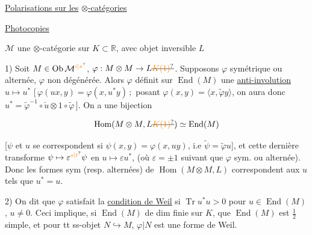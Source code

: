 
\uline{Polarisations sur les} \uline{$\otimes$-catégories }


\uline{Photocopies}


 $\mathcal M$ une $\otimes$-catégorie sur $K\subset\mathbb R$, avec   objet inversible  $L$

1) Soit $M\in\operatorname{Ob}\mathcal M^{\unsure{i|*}}$, $\varphi:M\otimes M\to L\deleted{\unsure{K(1)}}$. Supposons $\varphi$ symétrique ou alternée, $\varphi$ non dégénérée. Alors $\varphi$ définit sur $\operatorname{End}(M)$ une \uline{anti-involution} $u\mapsto u^*$ $[\,\varphi(ux,y)=\varphi(x,u^*y)\,;$ posant $\varphi(x,y)=\langle x,\widetilde\varphi y\rangle$,  on aura donc $u^*=\widetilde\varphi^{-1}\circ\check u\otimes1\circ\widetilde\varphi\,]$.  On a une bijection

\[
\operatorname{Hom}(M\otimes M,L\deleted{\unsure{K(1)}})\simeq\operatorname{End}(M)
\]

[$\psi$ et $u$ se correspondent si $\psi(x,y)=\varphi(x,uy)$, i.e $\widetilde\psi=\widetilde\varphi u$], et cette dernière  transforme $\psi\mapsto\varepsilon{}^{\unsure{s|t}}\psi$ en $u\mapsto\varepsilon u^*$, (où $\varepsilon=\pm1$ suivant que $\varphi$ sym. ou alternée). Donc les formes sym (resp. alternées) de $\operatorname{Hom}(M\otimes M,L)$ correspondent aux $u$ tels que $u^*=u$.

2) On dit que $\varphi$  satisfait la \uline{condition de Weil} si  $\operatorname{Tr}u^*u>0$ pour $u\in\operatorname{End}(M)$, $u\ne0$. Ceci implique, si $\operatorname{End}(M)$ de dim finie sur $K$, que $\operatorname{End}(M)$ est $\frac12$ simple, et pour tt ss-objet $N\hookrightarrow M$, $\varphi|N$ est une forme de Weil.


